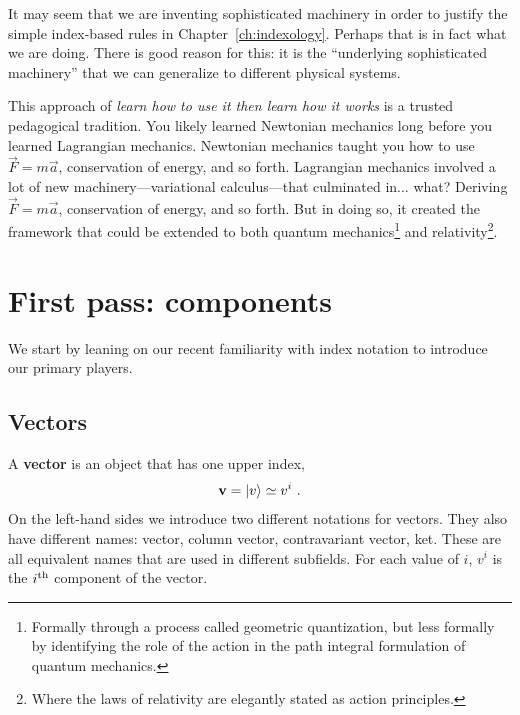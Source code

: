 \documentclass[12pt, oneside]{report}    %
\let\oldsection\section
\def\section{%
  \setcounter{sidenote}{1}%
  \oldsection
}
\begin{document}
It may seem that we are inventing sophisticated machinery in order to justify the simple index-based rules in Chapter~\ref{ch:indexology}. Perhaps that is in fact what we are doing. There is good reason for this: it is the ``underlying sophisticated machinery'' that we can generalize to different physical systems.

\begin{example}
This approach of \emph{learn how to use it then learn how it works} is a trusted pedagogical tradition. You likely learned Newtonian mechanics long before you learned Lagrangian mechanics. Newtonian mechanics taught you how to use $\vec{F} = m\vec{a}$, conservation of energy, and so forth. Lagrangian mechanics involved a lot of new machinery---variational calculus---that culminated in... what? Deriving $\vec{F}=m\vec{a}$, conservation of energy, and so forth. But in doing so, it created the framework that could be extended to both quantum mechanics\footnote{Formally through a process called geometric quantization, but less formally by identifying the role of the action in the path integral formulation of quantum mechanics.} and relativity\footnote{Where the laws of relativity are elegantly stated as action principles.}.
\end{example} 

\section{First pass: components}

We start by leaning on our recent familiarity with index notation to introduce our primary players.

\subsection{Vectors}

A \textbf{vector} is an object that has one upper index,
\begin{align}
    \mathbf{v} = \left|v\right\rangle \simeq v^i \ .
\end{align}
On the left-hand sides we introduce two different notations for vectors. They also have different names: vector, column vector, contravariant vector, ket. These are all equivalent names that are used in different subfields. For each value of $i$, $v^i$ is the $i^\textnormal{th}$ component of the vector. 
\end{document}
